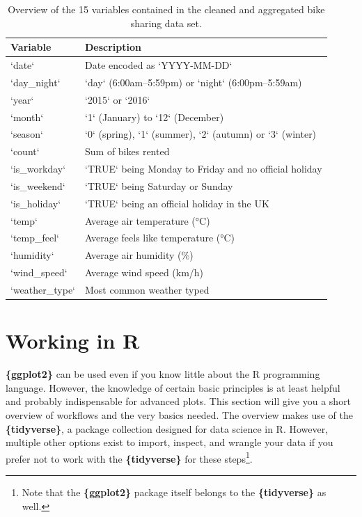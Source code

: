 \documentclass[
]{krantz}
\begin{document}
\begin{longtable}[t]{ll}
\caption{\label{tab:03tableBikesData}Overview of the 15 variables contained in the cleaned and aggregated bike sharing data set.}\\
\toprule
Variable & Description\\
\midrule
`date` & Date encoded as `YYYY-MM-DD`\\
`day\_night` & `day` (6:00am–5:59pm) or `night` (6:00pm–5:59am)\\
`year` & `2015` or `2016`\\
`month` & `1` (January) to `12` (December)\\
`season` & `0` (spring), `1` (summer), `2` (autumn) or `3` (winter)\\
\addlinespace
`count` & Sum of bikes rented\\
`is\_workday` & `TRUE` being Monday to Friday and no official holiday\\
`is\_weekend` & `TRUE` being Saturday or Sunday\\
`is\_holiday` & `TRUE` being an official holiday in the UK\\
`temp` & Average air temperature (°C)\\
\addlinespace
`temp\_feel` & Average feels like temperature (°C)\\
`humidity` & Average air humidity (\%)\\
`wind\_speed` & Average wind speed (km/h)\\
`weather\_type` & Most common weather typed\\
\bottomrule
\end{longtable}

\hypertarget{rstats}{%
\section{Working in R}\label{rstats}}

\textbf{\{ggplot2\}} can be used even if you know little about the R programming language. However, the knowledge of certain basic principles is at least helpful and probably indispensable for advanced plots. This section will give you a short overview of workflows and the very basics needed. The overview makes use of the \textbf{\{tidyverse\}}, a package collection designed for data science in R. However, multiple other options exist to import, inspect, and wrangle your data if you prefer not to work with the \textbf{\{tidyverse\}} for these steps\footnote{Note that the \textbf{\{ggplot2\}} package itself belongs to the \textbf{\{tidyverse\}} as well.}.
\end{document}
